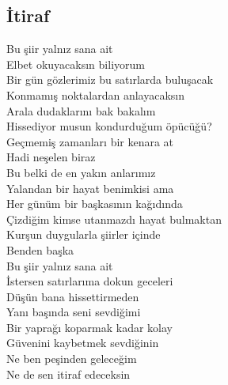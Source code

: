 \subsection{İtiraf}

Bu şiir yalnız sana ait \\
Elbet okuyacaksın biliyorum \\
Bir gün gözlerimiz bu satırlarda buluşacak \\
Konmamış noktalardan anlayacaksın \\
Arala dudaklarını bak bakalım \\
Hissediyor musun kondurduğum öpücüğü? \\
Geçmemiş zamanları bir kenara at \\
Hadi neşelen biraz \\
Bu belki de en yakın anlarımız \\

\noindent\newline
Yalandan bir hayat benimkisi ama \\
Her günüm bir başkasının kağıdında \\
Çizdiğim kimse utanmazdı hayat bulmaktan \\
Kurşun duygularla şiirler içinde \\
Benden başka \\

\noindent\newline
Bu şiir yalnız sana ait \\
İstersen satırlarıma dokun geceleri \\
Düşün bana hissettirmeden \\
Yanı başında seni sevdiğimi \\
Bir yaprağı koparmak kadar kolay \\
Güvenini kaybetmek sevdiğinin \\
Ne ben peşinden geleceğim \\
Ne de sen itiraf edeceksin \\